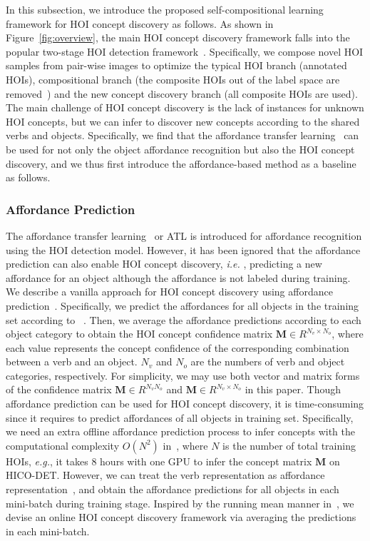 \documentclass[runningheads]{llncs}
\newcommand{\ie}{\textit{i.e. }}
\newcommand{\eg}{\textit{e.g.}}
\begin{document}
In this subsection, we introduce the proposed self-compositional learning framework for HOI concept discovery as follows. As shown in Figure~\ref{fig:overview}, the main HOI concept discovery framework falls into the popular two-stage HOI detection framework~\cite{hou2020visual}.
Specifically, we compose novel HOI samples from pair-wise images to optimize the typical HOI branch (annotated HOIs), compositional branch (the composite HOIs out of the label space are removed~\cite{hou2020visual,hou2021atl}) and the new concept discovery branch (all composite HOIs are used).
The main challenge of HOI concept discovery is the lack of instances for unknown HOI concepts, but we can infer to discover new concepts according to the shared verbs and objects. Specifically, we find that the affordance transfer learning~\cite{hou2021atl} can be used for not only the object affordance recognition but also the HOI concept discovery, and we thus first introduce the affordance-based method as a baseline as follows.


\subsubsection{Affordance Prediction}
\label{sec:aff_pred}
The affordance transfer learning~\cite{hou2021atl} or ATL is introduced for affordance recognition using the HOI detection model. However, it has been ignored that the affordance prediction can also enable HOI concept discovery, \ie, predicting a new affordance for an object although the affordance is not labeled during training. We describe a vanilla approach for HOI concept discovery using affordance prediction~\cite{hou2021atl}. Specifically, we predict the affordances for all objects in the training set according to ~\cite{hou2021atl}. Then, we average the affordance predictions according to each object category to obtain the HOI concept confidence matrix $\mathbf{M} \in R^{N_v \times N_o}$, where each value represents the concept confidence of the corresponding combination between a verb and an object. $N_v$ and $N_o$ are the numbers of verb and object categories, respectively. For simplicity, we may use both vector and matrix forms of the confidence matrix $\mathbf{M} \in R^{N_vN_o}$ and $\mathbf{M} \in R^{N_v \times N_o}$ in this paper. Though affordance prediction can be used for HOI concept discovery, it is time-consuming since it requires to predict affordances of all objects in training set. Specifically, we need an extra offline affordance prediction process to infer concepts with the computational complexity $O(N^2)$ in~\cite{hou2021atl}, where $N$ is the number of total training HOIs, \eg, it takes 8 hours with one GPU to infer the concept matrix $\mathbf{M}$ on HICO-DET. However, we can treat the verb representation as affordance representation~\cite{hou2021atl}, and obtain the affordance predictions for all objects in 
each mini-batch during training stage. Inspired by the running mean manner in~\cite{ioffe2015batch}, we devise an online HOI concept discovery framework via averaging the predictions in each mini-batch.
\end{document}
